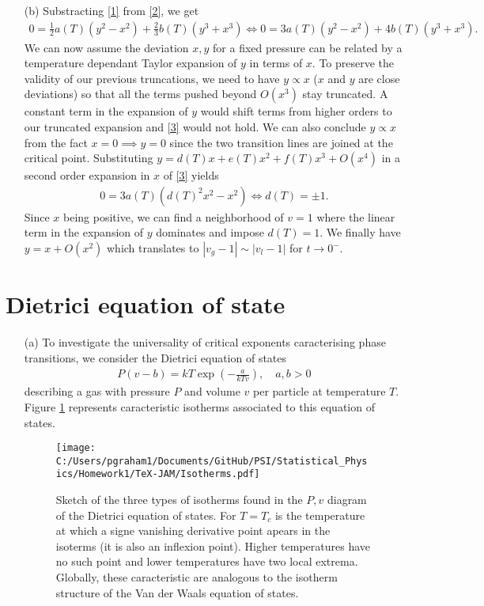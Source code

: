 \documentclass[10pt, a4paper]{article}
\begin{document}
{\begin{enumerate}
  \item[(b)] Substracting \eqref{1} from \eqref{2}, we get 
  \begin{align*}
    0 = \frac{1}{2}a(T) (y^2 - x^2) + \frac{2}{3}b(T) (y^3 + x^3) \iff 0 = 3a(T) (y^2 - x^2) + 4 b(T) (y^3 + x^3).  \tag{$\star\star\star$} \label{3}
  \end{align*}
  We can now assume the deviation $x, y$ for a fixed pressure can be related by a temperature dependant Taylor expansion of $y$ in terms of $x$. To preserve the validity of our previous truncations, we need to have $y \propto x$ ($x$ and $y$ are close deviations) so that all the terms pushed beyond $O(x^3)$ stay truncated. A constant term in the expansion of $y$ would shift terms from higher orders to our truncated expansion and \eqref{3} would not hold. We can also conclude $y \propto x$ from the fact $x=0 \implies y=0$ since the two transition lines are joined at the critical point. Substituting $y = d(T) x + e(T) x^2 + f(T) x^3 + O(x^4)$ in a second order expansion in $x$ of \eqref{3} yields 
  \begin{align*}
    0 = 3a(T) (d(T)^2 x^2 - x^2) \iff d(T) = \pm 1. 
  \end{align*}
  Since $x$ being positive, we can find a neighborhood of $v=1$ where the linear term in the expansion of $y$ dominates and impose $d(T) = 1$. We finally have $y = x + O(x^2)$ which translates to $|v_g-1| \sim |v_l-1|$ for $t \to 0^-$.
\end{enumerate}

\section{Dietrici equation of state}
\begin{enumerate}
  \item[(a)] To investigate the universality of critical exponents caracterising phase transitions, we consider the Dietrici equation of states 
  \begin{align*}
    P(v-b) = kT \exp\left(-\frac{a}{kT v}\right), \quad a, b > 0
  \end{align*} 
  describing a gas with pressure $P$ and volume $v$ per particle at temperature $T$. Figure \ref{f1} represents caracteristic isotherms associated to this equation of states. 

  \begin{figure}[h!]
    \centering
    \texttt{[image: C:/Users/pgraham1/Documents/GitHub/PSI/Statistical\_Physics/Homework1/TeX-JAM/Isotherms.pdf]}
    \caption{\label{f1} Sketch of the three types of isotherms found in the $P, v$ diagram of the Dietrici equation of states. For $T=T_c$ is the temperature at which a signe vanishing derivative point apears in the isoterms (it is also an inflexion point). Higher temperatures have no such point and lower temperatures have two local extrema. Globally, these caracteristic are analogous to the isotherm structure of the Van der Waals equation of states.}
  \end{figure}


\end{enumerate}}
\end{document}
